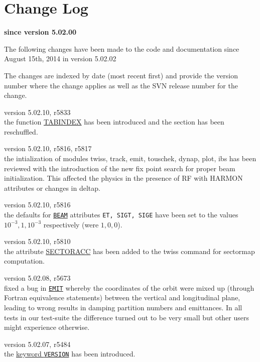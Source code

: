 \chapter*{Change Log}
\label{chap:changelog}

\begin{center} 
\textbf{since version 5.02.00}
\end{center}

The following changes have been made to the code and documentation since
August 15th, 2014 in version 5.02.02

The changes are indexed by date (most recent first) and provide the \madx 
version number where the change applies as well as the SVN 
release number for the change. 

\begin{madlist}
   version 5.02.10, r5833\\
  the function \hyperref[subsubsec:table]{TABINDEX} has been introduced and the section has been reschuffled.

   version 5.02.10, r5816, r5817\\
  the intialization of modules twiss, track, emit, touschek, dynap, plot, ibs has been reviewed with the introduction of the new fix point search for proper beam initialization. This affected the physics in the presence of RF with HARMON attributes or changes in deltap.

   version 5.02.10, r5816\\
  the defaults for \hyperref[sec:beam]{\texttt{BEAM}} attributes \texttt{ET, SIGT, SIGE} have been set to the values $10^{-3}, 1, 10^{-3}$ respectively (were $1, 0, 0$).

   version 5.02.10, r5810\\
  the attribute \hyperref[chap:twiss]{SECTORACC} has been added to the twiss command for sectormap computation.

   version 5.02.08, r5673\\
  fixed a bug in \hyperref[chap:emit]{\texttt{EMIT}} whereby the
  coordinates of the orbit were mixed up (through Fortran equivalence
  statements) between the vertical and longitudinal plane, leading to
  wrong results in damping partition numbers and emittances. In all tests
  in our test-suite the difference turned out to be very small but other
  users might experience otherwise.

   version 5.02.07, r5484\\
  the \hyperref[subsec:keyword]{keyword \texttt{VERSION}} has been introduced.
  

\end{madlist}
